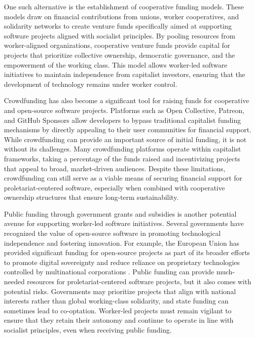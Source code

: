 \begin{refsection}
One such alternative is the establishment of cooperative funding models. These models draw on financial contributions from unions, worker cooperatives, and solidarity networks to create venture funds specifically aimed at supporting software projects aligned with socialist principles. By pooling resources from worker-aligned organizations, cooperative venture funds provide capital for projects that prioritize collective ownership, democratic governance, and the empowerment of the working class. This model allows worker-led software initiatives to maintain independence from capitalist investors, ensuring that the development of technology remains under worker control.

Crowdfunding has also become a significant tool for raising funds for cooperative and open-source software projects. Platforms such as Open Collective, Patreon, and GitHub Sponsors allow developers to bypass traditional capitalist funding mechanisms by directly appealing to their user communities for financial support. While crowdfunding can provide an important source of initial funding, it is not without its challenges. Many crowdfunding platforms operate within capitalist frameworks, taking a percentage of the funds raised and incentivizing projects that appeal to broad, market-driven audiences. Despite these limitations, crowdfunding can still serve as a viable means of securing financial support for proletariat-centered software, especially when combined with cooperative ownership structures that ensure long-term sustainability.

Public funding through government grants and subsidies is another potential avenue for supporting worker-led software initiatives. Several governments have recognized the value of open-source software in promoting technological independence and fostering innovation. For example, the European Union has provided significant funding for open-source projects as part of its broader efforts to promote digital sovereignty and reduce reliance on proprietary technologies controlled by multinational corporations \cite[pp.~34]{eu_commission_open_source_initiatives}. Public funding can provide much-needed resources for proletariat-centered software projects, but it also comes with potential risks. Governments may prioritize projects that align with national interests rather than global working-class solidarity, and state funding can sometimes lead to co-optation. Worker-led projects must remain vigilant to ensure that they retain their autonomy and continue to operate in line with socialist principles, even when receiving public funding.


\end{refsection}
